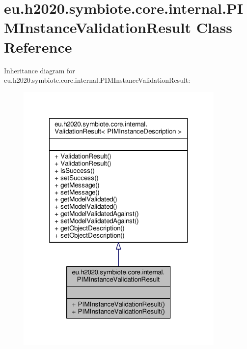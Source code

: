 \hypertarget{classeu_1_1h2020_1_1symbiote_1_1core_1_1internal_1_1PIMInstanceValidationResult}{}\section{eu.\+h2020.\+symbiote.\+core.\+internal.\+P\+I\+M\+Instance\+Validation\+Result Class Reference}
\label{classeu_1_1h2020_1_1symbiote_1_1core_1_1internal_1_1PIMInstanceValidationResult}


Inheritance diagram for eu.\+h2020.\+symbiote.\+core.\+internal.\+P\+I\+M\+Instance\+Validation\+Result\+:\nopagebreak
\begin{figure}[H]
\begin{center}
\leavevmode
\includegraphics[width=290pt]{classeu_1_1h2020_1_1symbiote_1_1core_1_1internal_1_1PIMInstanceValidationResult__inherit__graph}
\end{center}
\end{figure}


